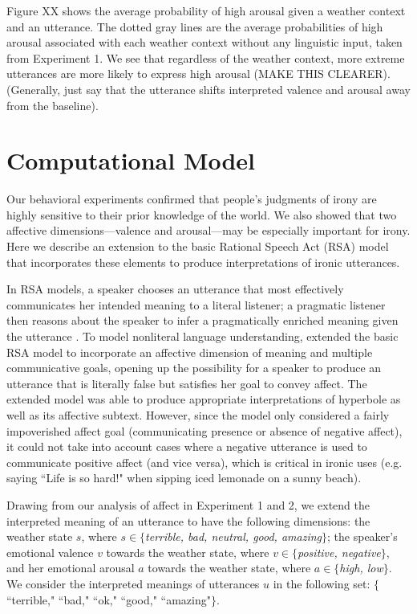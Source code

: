 \documentclass[10pt,letterpaper]{article}
\begin{document}
Figure XX shows the average probability of high arousal given a weather context and an utterance. The dotted gray lines are the average probabilities of high arousal associated with each weather context without any linguistic input, taken from Experiment 1. We see that regardless of the weather context, more extreme utterances are more likely to express high arousal (MAKE THIS CLEARER). (Generally, just say that the utterance shifts interpreted valence and arousal away from the baseline). 

\section{Computational Model}
Our behavioral experiments confirmed that people's judgments of irony are highly sensitive to their prior knowledge of the world. We also showed that two affective dimensions---valence and arousal---may be especially important for irony. Here we describe an extension to the basic Rational Speech Act (RSA) model that incorporates these elements to produce interpretations of ironic utterances. 

In RSA models, a speaker chooses an utterance that most effectively communicates her intended meaning to a literal listener; a pragmatic listener then reasons about the speaker to infer a pragmatically enriched meaning given the utterance \cite{frank2012predicting, goodman2013knowledge}. To model nonliteral language understanding,  extended the basic RSA model to incorporate an affective dimension of meaning and multiple communicative goals, opening up the possibility for a speaker to produce an utterance that is literally false but satisfies her goal to convey affect. The extended model was able to produce appropriate interpretations of hyperbole as well as its affective subtext. However, since the model only considered a fairly impoverished affect goal (communicating presence or absence of negative affect), it could not take into account cases where a negative utterance is used to communicate positive affect (and vice versa), which is critical in ironic uses (e.g. saying ``Life is so hard!" when sipping iced lemonade on a sunny beach). 

Drawing from our analysis of affect in Experiment 1 and 2, we extend the interpreted meaning of an utterance to have the following dimensions: the weather state $s$, where $s \in \{$\emph{terrible, bad, neutral, good, amazing}$\}$; the speaker's emotional valence $v$ towards the weather state, where $v \in \{$\emph{positive, negative}$\}$, and her emotional arousal $a$ towards the weather state, where $a \in \{$\emph{high, low}$\}$. We consider the interpreted meanings of utterances $u$ in the following set: $\{$``terrible," ``bad," ``ok," ``good," ``amazing"$\}$. 
\end{document}
